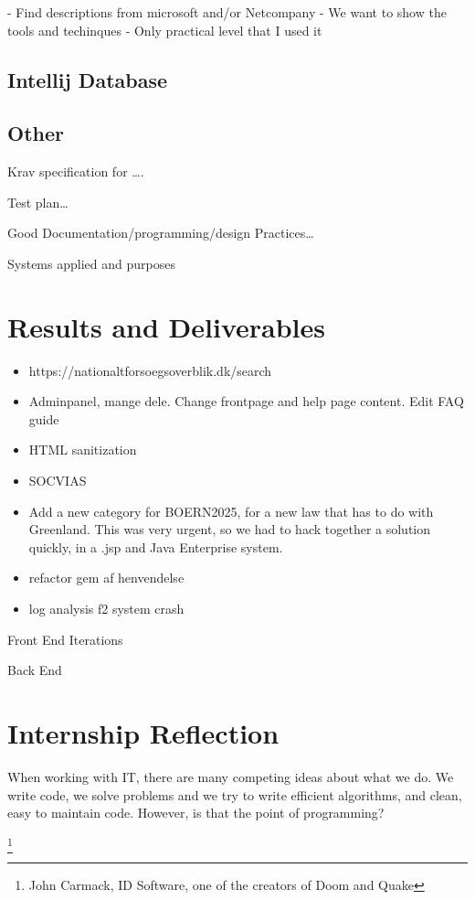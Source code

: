 \documentclass[../main.tex]{subfiles}
\begin{document}
- Find descriptions from microsoft and/or Netcompany
- We want to show the tools and techinques
- Only practical level that I used it

\subsection{Intellij Database}
\subsection{Other}
Krav specification for …. 

Test plan… 

Good Documentation/programming/design Practices… 

Systems applied and purposes 


\section{Results and Deliverables}

\begin{itemize}
    \item https://nationaltforsoegsoverblik.dk/search 
    \item Adminpanel, mange dele. Change frontpage and help page content. Edit FAQ guide 
    \item HTML sanitization 
    \item SOCVIAS 
    \item Add a new category for BOERN2025, for a new law that has to do with Greenland. This was very urgent, so we had to hack together a solution quickly, in a .jsp and Java Enterprise system. 
    \item refactor gem af henvendelse
    \item log analysis f2 system crash
\end{itemize}


Front End Iterations 

Back End 

\section{Internship Reflection}

When working with IT, there are many competing ideas about what we do. We write
code, we solve problems and we try to write efficient algorithms, and clean, easy to maintain code. However, is that the point of programming? 

\footnote{John Carmack, ID Software, one of the creators of Doom and Quake}
\end{document}
